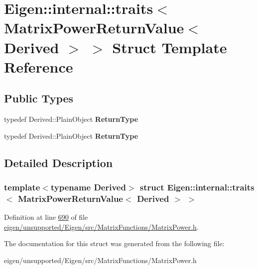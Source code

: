 \hypertarget{struct_eigen_1_1internal_1_1traits_3_01_matrix_power_return_value_3_01_derived_01_4_01_4}{}\section{Eigen\+:\+:internal\+:\+:traits$<$ Matrix\+Power\+Return\+Value$<$ Derived $>$ $>$ Struct Template Reference}
\label{struct_eigen_1_1internal_1_1traits_3_01_matrix_power_return_value_3_01_derived_01_4_01_4}
\subsection*{Public Types}
\begin{DoxyCompactItemize}
\item 
\mbox{\label{struct_eigen_1_1internal_1_1traits_3_01_matrix_power_return_value_3_01_derived_01_4_01_4_a876efd5d7e269416eeceaffb0fc008fb}} 
typedef Derived\+::\+Plain\+Object {\bfseries Return\+Type}
\item 
\mbox{\label{struct_eigen_1_1internal_1_1traits_3_01_matrix_power_return_value_3_01_derived_01_4_01_4_a876efd5d7e269416eeceaffb0fc008fb}} 
typedef Derived\+::\+Plain\+Object {\bfseries Return\+Type}
\end{DoxyCompactItemize}


\subsection{Detailed Description}
\subsubsection*{template$<$typename Derived$>$\newline
struct Eigen\+::internal\+::traits$<$ Matrix\+Power\+Return\+Value$<$ Derived $>$ $>$}



Definition at line \hyperlink{eigen_2unsupported_2_eigen_2src_2_matrix_functions_2_matrix_power_8h_source_l00690}{690} of file \hyperlink{eigen_2unsupported_2_eigen_2src_2_matrix_functions_2_matrix_power_8h_source}{eigen/unsupported/\+Eigen/src/\+Matrix\+Functions/\+Matrix\+Power.\+h}.



The documentation for this struct was generated from the following file\+:\begin{DoxyCompactItemize}
\item 
eigen/unsupported/\+Eigen/src/\+Matrix\+Functions/\+Matrix\+Power.\+h\end{DoxyCompactItemize}
